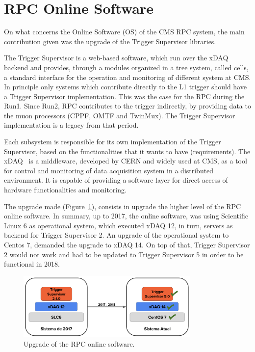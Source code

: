 \section{RPC Online Software}

On what concerns the Online Software (OS) of the CMS RPC system, the main contribution given was the upgrade of the Trigger Supervisor libraries.

The Trigger Supervisor is a web-based software, which run over the xDAQ backend and provides, through a modules organized in a tree system, called cells, a standard interface for the operation and monitoring of different system at CMS. In principle only systems which contribute directly to the L1 trigger should have a Trigger Supervisor implementation. This was the case for the  RPC during the Run1. Since Run2, RPC contributes to the trigger indirectly, by providing data to the muon processors (CPPF, OMTF and TwinMux). The Trigger Supervisor implementation is a legacy from that period.

Each subsystem is responsible for its own implementation of the Trigger Supervisor, based on the functionalities that it wants to have (requirements). The xDAQ~\cite{xdaq} is a middleware, developed by CERN and widely used at CMS, as a tool for control and monitoring of data acquisition system in a distributed environment. It is capable of providing a software layer for direct access of hardware functionalities and monitoring.

The upgrade made (Figure~\ref{ts_upgrade}), consists in upgrade the higher level of the RPC online software. In summary, up to 2017, the online software, was using Scientific Linux 6 as operational system, which executed xDAQ 12, in turn, servers as backend for Trigger Supervisor 2. An upgrade of the operational system to Centos 7, demanded the upgrade to xDAQ 14. On top of that, Trigger Supervisor 2 would not work and had to be updated to Trigger Supervisor 5 in order to be functional in 2018.

\begin{figure}[h]
\begin{center}
\includegraphics[width=0.8\textwidth,keepaspectratio]{figures_and_tables/rpc/ts_upgrade.png}
\end{center}
\caption{Upgrade of the RPC online software.}\label{ts_upgrade}
\end{figure}

